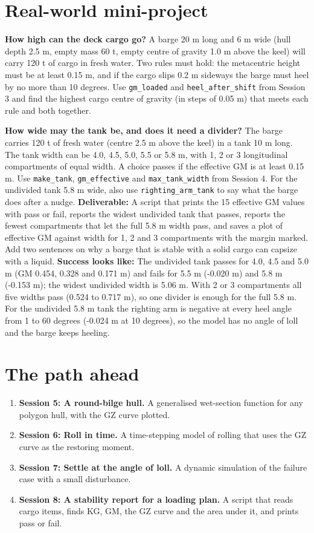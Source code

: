 \documentclass[11pt,a4paper]{article}
\begin{document}
\section{Real-world mini-project}
\textbf{How high can the deck cargo go?} A barge 20 m long and 6 m wide (hull depth 2.5 m, empty mass 60 t, empty centre of gravity 1.0 m above the keel) will carry 120 t of cargo in fresh water. Two rules must hold: the metacentric height must be at least 0.15 m, and if the cargo slips 0.2 m sideways the barge must heel by no more than 10 degrees. Use \texttt{gm\_loaded} and \texttt{heel\_after\_shift} from Session 3 and find the highest cargo centre of gravity (in steps of 0.05 m) that meets each rule and both together.

\textbf{How wide may the tank be, and does it need a divider?} The barge carries 120 t of fresh water (centre 2.5 m above the keel) in a tank 10 m long. The tank width can be 4.0, 4.5, 5.0, 5.5 or 5.8 m, with 1, 2 or 3 longitudinal compartments of equal width. A choice passes if the effective GM is at least 0.15 m. Use \texttt{make\_tank}, \texttt{gm\_effective} and \texttt{max\_tank\_width} from Session 4. For the undivided tank 5.8 m wide, also use \texttt{righting\_arm\_tank} to say what the barge does after a nudge. \textbf{Deliverable:} A script that prints the 15 effective GM values with pass or fail, reports the widest undivided tank that passes, reports the fewest compartments that let the full 5.8 m width pass, and saves a plot of effective GM against width for 1, 2 and 3 compartments with the margin marked. Add two sentences on why a barge that is stable with a solid cargo can capsize with a liquid. \textbf{Success looks like:} The undivided tank passes for 4.0, 4.5 and 5.0 m (GM 0.454, 0.328 and 0.171 m) and fails for 5.5 m (-0.020 m) and 5.8 m (-0.153 m); the widest undivided width is 5.06 m. With 2 or 3 compartments all five widths pass (0.524 to 0.717 m), so one divider is enough for the full 5.8 m. For the undivided 5.8 m tank the righting arm is negative at every heel angle from 1 to 60 degrees (-0.024 m at 10 degrees), so the model has no angle of loll and the barge keeps heeling.

\section{The path ahead}
\begin{enumerate}[nosep]
\item \textbf{Session 5: A round-bilge hull.} A generalised wet-section function for any polygon hull, with the GZ curve plotted.
\item \textbf{Session 6: Roll in time.} A time-stepping model of rolling that uses the GZ curve as the restoring moment.
\item \textbf{Session 7: Settle at the angle of loll.} A dynamic simulation of the failure case with a small disturbance.
\item \textbf{Session 8: A stability report for a loading plan.} A script that reads cargo items, finds KG, GM, the GZ curve and the area under it, and prints pass or fail.
\end{enumerate}
\end{document}

